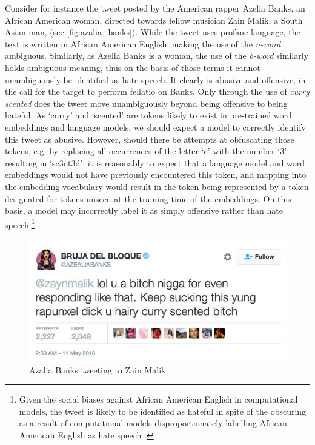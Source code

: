 Consider for instance the tweet posted by the American rapper Azelia Banks, an African American woman, directed towards fellow musician Zain Malik, a South Asian man, (see \autoref{fig:azalia_banks}). While the tweet uses profane language, the text is written in African American English, making the use of the \textit{n-word} ambiguous. Similarly, as Azelia Banks is a woman, the use of the \textit{b-word} similarly holds ambiguous meaning, thus on the basis of those terms it cannot unambiguously be identified as hate speech. It clearly is abusive and offensive, in the call for the target to perform fellatio on Banks. Only through the use of \textit{curry scented} does the tweet move unambiguously beyond being offensive to being hateful. As `curry' and `scented' are tokens likely to exist in pre-trained word embeddings and language models, we should expect a model to correctly identify this tweet as abusive. However, should there be attempts at obfuscating those tokens, e.g. by replacing all occurrences of the letter `e' with the number `$3$' resulting in `sc3nt3d', it is reasonably to expect that a language model and word embeddings would not have previously encountered this token, and mapping into the embedding vocabulary would result in the token being represented by a token designated for tokens unseen at the training time of the embeddings. On this basis, a model may incorrectly label it as simply offensive rather than hate speech.\footnote{Given the social biases against African American English in computational models, the tweet is likely to be identified as hateful in spite of the obscuring as a result of computational models disproportionately labelling African American English as hate speech \citep{Davidson:2019}.}

\begin{figure}[h]
  \centering
  \includegraphics[scale=0.5]{Azalia_banks.jpeg}
  \caption{Azalia Banks tweeting to Zain Malik.}
  \label{fig:azalia_banks}
\end{figure}

